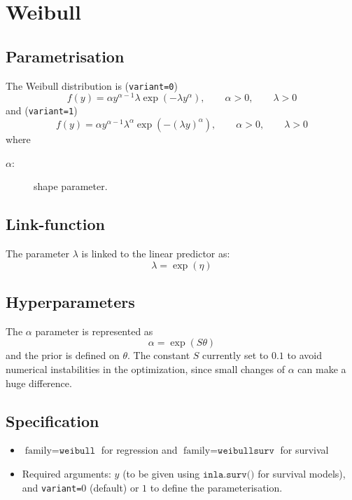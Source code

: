 \documentclass[a4paper,11pt]{article}
\begin{document}
\section*{Weibull}

\subsection*{Parametrisation}

The Weibull distribution is (\texttt{variant=0})
\begin{displaymath}
    f(y) = \alpha y^{\alpha-1}
    \lambda\exp( - \lambda  y^{\alpha}),
    \qquad \alpha>0, \qquad \lambda>0
\end{displaymath}
and (\texttt{variant=1})
\begin{displaymath}
    f(y) = \alpha y^{\alpha-1}
    \lambda^{\alpha}\exp( - (\lambda  y)^{\alpha}),
    \qquad \alpha>0, \qquad \lambda>0
\end{displaymath}
where
\begin{description}
\item[$\alpha$:] shape parameter.
\end{description}

\subsection*{Link-function}

The parameter $\lambda$ is linked to the linear predictor as:
\[
    \lambda = \exp(\eta)
\]
\subsection*{Hyperparameters}

The $\alpha$ parameter is represented as
\[
    \alpha = \exp(S\theta)
\]
and the prior is defined on $\theta$. The constant $S$ currently set
to $0.1$ to avoid numerical instabilities in the optimization, since
small changes of $\alpha$ can make a huge difference.

\subsection*{Specification}

\begin{itemize}
\item $\text{family}=\texttt{weibull}$ for regression and
 $\text{family}=\texttt{weibullsurv}$ for survival
\item Required arguments: $y$ (to be given using
    $\texttt{inla.surv()}$ for survival models), and
    \texttt{variant=}$0$ (default) or $1$ to define the
    parameterisation.
\end{itemize}
\end{document}
